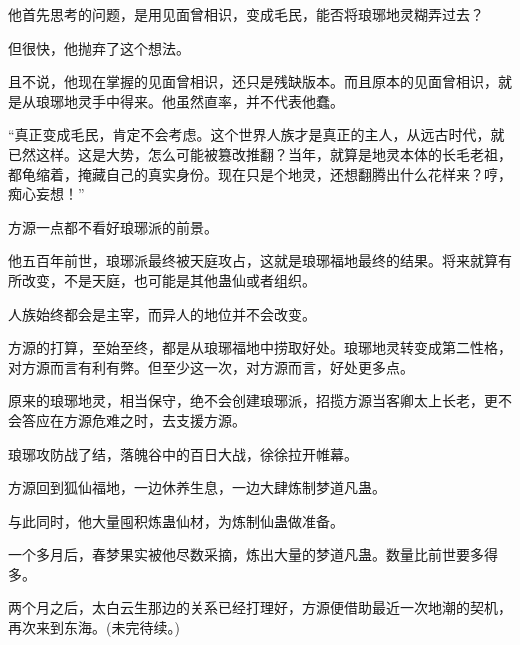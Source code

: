 \begin{this_body}
他首先思考的问题，是用见面曾相识，变成毛民，能否将琅琊地灵糊弄过去？

但很快，他抛弃了这个想法。

且不说，他现在掌握的见面曾相识，还只是残缺版本。而且原本的见面曾相识，就是从琅琊地灵手中得来。他虽然直率，并不代表他蠢。

“真正变成毛民，肯定不会考虑。这个世界人族才是真正的主人，从远古时代，就已然这样。这是大势，怎么可能被篡改推翻？当年，就算是地灵本体的长毛老祖，都龟缩着，掩藏自己的真实身份。现在只是个地灵，还想翻腾出什么花样来？哼，痴心妄想！”

方源一点都不看好琅琊派的前景。

他五百年前世，琅琊派最终被天庭攻占，这就是琅琊福地最终的结果。将来就算有所改变，不是天庭，也可能是其他蛊仙或者组织。

人族始终都会是主宰，而异人的地位并不会改变。

方源的打算，至始至终，都是从琅琊福地中捞取好处。琅琊地灵转变成第二性格，对方源而言有利有弊。但至少这一次，对方源而言，好处更多点。

原来的琅琊地灵，相当保守，绝不会创建琅琊派，招揽方源当客卿太上长老，更不会答应在方源危难之时，去支援方源。

琅琊攻防战了结，落魄谷中的百日大战，徐徐拉开帷幕。

方源回到狐仙福地，一边休养生息，一边大肆炼制梦道凡蛊。

与此同时，他大量囤积炼蛊仙材，为炼制仙蛊做准备。

一个多月后，春梦果实被他尽数采摘，炼出大量的梦道凡蛊。数量比前世要多得多。

两个月之后，太白云生那边的关系已经打理好，方源便借助最近一次地潮的契机，再次来到东海。(未完待续。)

\end{this_body}

